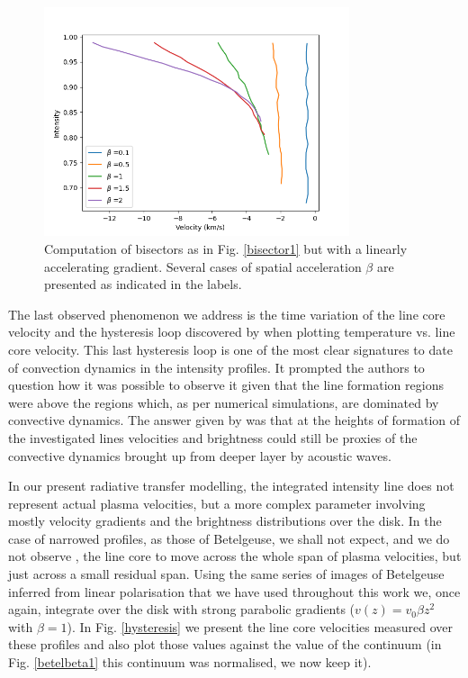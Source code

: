 \documentclass{/Users/art2/TeX/aanda/aa}
\begin{document}
\begin{figure}
   \includegraphics[width=0.8\textwidth]{Bisectors_accel.png}
   \caption{Computation of bisectors as in Fig. \ref{bisector1} but with a linearly accelerating gradient. Several cases of  spatial acceleration $\beta$ 
   are presented as indicated in the labels.}
   \label{bisector2}
   \end{figure}

The last observed phenomenon we address is the time variation of the line core velocity and the hysteresis loop discovered by 
\cite{kravchenko_tomography_2019} when plotting temperature vs. line core velocity. This last hysteresis loop is one of the most clear signatures 
to date of convection dynamics in the intensity profiles. It prompted the authors to question how it was possible to observe it given that the 
line formation regions were above the regions which, as per numerical simulations, are dominated by convective dynamics. The answer given by \cite{kravchenko_tomography_2019} was that at the heights of formation of the investigated lines velocities and brightness could still be 
proxies of the convective dynamics brought up from deeper layer by acoustic waves. 

In our present radiative transfer modelling, the integrated intensity line does not represent actual plasma velocities, but a more complex parameter 
involving mostly velocity gradients and the brightness distributions over the disk. In the case of narrowed profiles, as those of Betelgeuse, we shall 
not expect, and we do not observe , the line core to move across the whole span of plasma velocities, but just across a small residual span. Using the 
same series of images of Betelgeuse inferred from linear polarisation that we have used throughout this work \citep{auriere_discovery_2016} we, once 
again, integrate over the disk with strong parabolic gradients ($v(z)=v_0\beta z^2$ with $\beta=1$). In Fig. \ref{hysteresis} we present the line core velocities measured over these 
profiles and also plot those values against the value of the continuum (in Fig. \ref{betelbeta1} this continuum was normalised, we now keep it).
\end{document}
